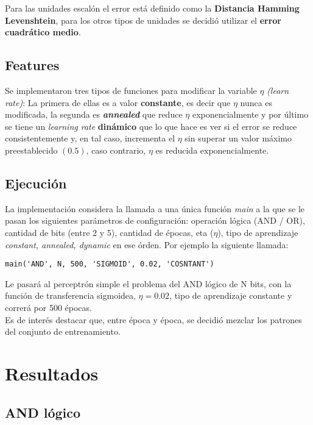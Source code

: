 \documentclass[%
    final,
    reprint,
    notitlepage,
    narroweqnarray,
    inline,
    twoside,
    invited
    ]{ieee}
\begin{document}
\par Para las unidades escalón el error está definido como la \textbf{Distancia Hamming Levenshtein}, para los otros tipos de unidades se decidió utilizar el \textbf{error cuadrático medio}.

\subsection{Features}

\par Se implementaron tres tipos de funciones para modificar la variable $\eta$ \textit{(learn rate)}: La primera de ellas es a valor \textbf{constante}, es decir que $\eta$ nunca es modificada, la segunda es \textbf{\textit{annealed}} que reduce $\eta$ exponencialmente y por último se tiene un \textit{learning rate} \textbf{dinámico} que lo que hace es ver si el error se reduce consistentemente y, en tal caso, incrementa el $\eta$ sin superar un valor máximo preestablecido $(0.5)$, caso contrario, $\eta$ es reducida exponencialmente.

\subsection{Ejecución}

\par La implementación considera la llamada a una única función \textit{main} a la que se le pasan los siguientes parámetros de configuración: operación lógica (AND / OR), cantidad de bits (entre 2 y 5), cantidad de épocas, eta ($\eta$), tipo de aprendizaje \textit{constant, annealed, dynamic} en ese órden.
Por ejemplo la siguiente llamada:

\begin{verbatim}
main('AND', N, 500, 'SIGMOID', 0.02, 'COSNTANT')
\end{verbatim}

Le pasará al perceptrón simple el problema del AND lógico de N bits, con la función de transferencia sigmoidea, $\eta=0.02$, tipo de aprendizaje constante y correrá por 500 épocas.\\
Es de interés destacar que, entre época y época, se decidió mezclar los patrones del conjunto de entrenamiento.

\section{Resultados}

\subsection{AND lógico}
\end{document}
